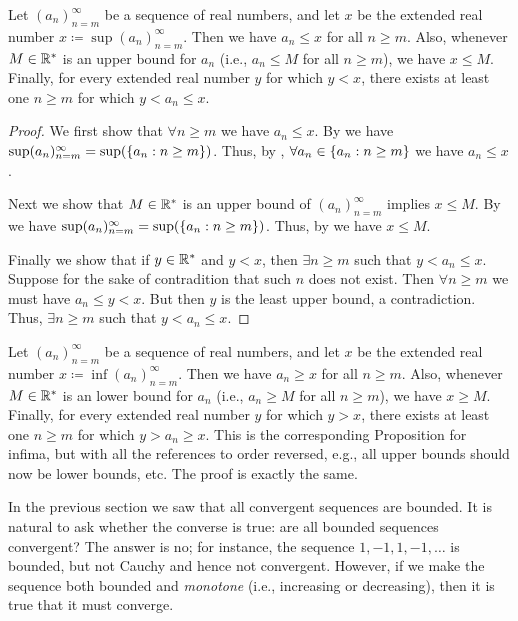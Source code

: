 \setcounter{thm}{5}
\begin{prop}\label{i:6.3.6}
  Let \((a_n)_{n = m}^\infty\) be a sequence of real numbers, and let \(x\) be the extended real number \(x \coloneqq \sup(a_n)_{n = m}^\infty\).
  Then we have \(a_n \leq x\) for all \(n \geq m\).
  Also, whenever \(M \in \mathbb{R}^*\) is an upper bound for \(a_n\) (i.e., \(a_n \leq M\) for all \(n \geq m\)), we have \(x \leq M\).
  Finally, for every extended real number \(y\) for which \(y < x\), there exists at least one \(n \geq m\) for which \(y < a_n \leq x\).
\end{prop}

\begin{proof}
  We first show that \(\forall n \geq m\) we have \(a_n \leq x\).
  By  we have \(\sup(a_n)_{n = m}^\infty = \sup(\left\lbrace a_n : n \geq m\right\rbrace)\).
  Thus, by , \(\forall a_n \in \left\lbrace a_n : n \geq m\right\rbrace\) we have \(a_n \leq x\).

  Next we show that \(M \in \mathbb{R}^*\) is an upper bound of \((a_n)_{n = m}^\infty\) implies \(x \leq M\).
  By  we have \(\sup(a_n)_{n = m}^\infty = \sup(\left\lbrace a_n : n \geq m\right\rbrace)\).
  Thus, by  we have \(x \leq M\).

  Finally we show that if \(y \in \mathbb{R}^*\) and \(y < x\), then \(\exists n \geq m\) such that \(y < a_n \leq x\).
  Suppose for the sake of contradition that such \(n\) does not exist.
  Then \(\forall n \geq m\) we must have \(a_n \leq y < x\).
  But then \(y\) is the least upper bound, a contradiction.
  Thus, \(\exists n \geq m\) such that \(y < a_n \leq x\).
\end{proof}

\begin{rmk}\label{i:6.3.7}
  Let \((a_n)_{n = m}^\infty\) be a sequence of real numbers, and let \(x\) be the extended real number \(x \coloneqq \inf(a_n)_{n = m}^\infty\).
  Then we have \(a_n \geq x\) for all \(n \geq m\).
  Also, whenever \(M \in \mathbb{R}^*\) is an lower bound for \(a_n\) (i.e., \(a_n \geq M\) for all \(n \geq m\)), we have \(x \geq M\).
  Finally, for every extended real number \(y\) for which \(y > x\), there exists at least one \(n \geq m\) for which \(y > a_n \geq x\).
  This is the corresponding Proposition for infima, but with all the references to order reversed, e.g., all upper bounds should now be lower bounds, etc.
  The proof is exactly the same.
\end{rmk}

\begin{note}
  In the previous section we saw that all convergent sequences are bounded.
  It is natural to ask whether the converse is true:
  are all bounded sequences convergent?
  The answer is no;
  for instance, the sequence \(1, -1, 1, -1, \dots\) is bounded, but not Cauchy and hence not convergent.
  However, if we make the sequence both bounded and \emph{monotone} (i.e., increasing or decreasing), then it is true that it must converge.
\end{note}

